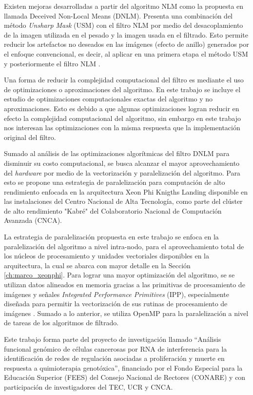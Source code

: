 Existen mejoras desarrolladas a partir del algoritmo NLM como la propuesta en \cite{calderon2015dewaff} llamada Deceived Non-Local Means (DNLM). Presenta una combinaci\'on del m\'etodo \textit{Unsharp Mask} (USM) con el filtro NLM por medio del desacoplamiento de la imagen utilizada en el pesado y la imagen usada en el filtrado. Esto permite reducir los artefactos no deseados en las im\'agenes (efecto de anillo) generados por el enfoque convencional, es decir, al aplicar en una primera etapa el m\'etodo USM y posteriormente el filtro NLM \cite{calderon2015dewaff}.  


Una forma de reducir la complejidad computacional del filtro es mediante el uso de optimizaciones o aproximaciones del algoritmo. En este trabajo se incluye el estudio de optimizaciones computacionales exactas del algoritmo y no aproximaciones. Esto es debido a que algunas optimizaciones logran reducir en efecto la complejidad computacional del algoritmo, sin embargo en este trabajo nos interesan las optimizaciones con la misma respuesta que la implementaci\'on original del filtro. 

Sumado al an\'alisis de las optimizaciones algor\'itmicas del filtro DNLM para disminuir su costo computacional, se busca alcanzar el mayor aprovechamiento del \textit{hardware} por medio de la vectorizaci\'on y paralelizaci\'on del algoritmo. Para esto se propone una estrategia de paralelizaci\'on para computaci\'on de alto rendimiento enfocada en la arquitectura Xeon Phi Knigths Landing disponible en las instalaciones del Centro Nacional de Alta Tecnolog\'ia, como parte del cl\'uster de alto rendimiento "Kabr\'e" del Colaboratorio Nacional de Computaci\'on Avanzada (CNCA).

La estrategia de paralelizaci\'on propuesta en este trabajo se enfoca en la paralelizaci\'on del algoritmo a nivel intra-nodo, para el aprovechamiento total de los n\'ucleos de procesamiento y unidades vectoriales disponibles en la arquitectura, la cual se abarca con mayor detalle en la Secci\'on \ref{ch:marco_xeonphi}. 
Para lograr una mayor optimizaci\'on del algoritmo, se se utilizan datos alineados en memoria gracias a las primitivas de procesamiento de im\'agenes y se\~nales \textit{Integrated Performance Primitives} (IPP), especialmente dise\~nada para permitir la vectorizaci\'on de sus rutinas de procesamiento de im\'agenes \cite{IntelCorporation2017}.       Sumado a lo anterior, se utiliza OpenMP para la paralelizaci\'on a nivel de tareas de los algoritmos de filtrado. 

Este trabajo forma parte del proyecto de investigaci\'on llamado ``Análisis funcional genómico de células cancerosas por RNA de interferencia para la identificación de redes de regulación asociadas a proliferación y muerte en respuesta a quimioterapia genotóxica'', financiado por el Fondo Especial para la Educaci\'on Superior (FEES) del Consejo Nacional de Rectores (CONARE) y con participaci\'on de investigadores del TEC, UCR y CNCA. 


